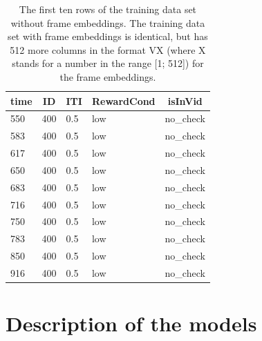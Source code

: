 \documentclass[
  man]{apa6}
\begin{document}
\begin{table}[tbp]

\begin{center}
\begin{threeparttable}

\caption{\label{tab:datatable}The first ten rows of the training data set without frame embeddings. The training data set with frame embeddings is identical, but has 512 more columns in the format VX (where X stands for a number in the range [1; 512]) for the frame embeddings.}

\begin{tabular}{lllll}
\toprule
time & \multicolumn{1}{c}{ID} & \multicolumn{1}{c}{ITI} & \multicolumn{1}{c}{RewardCond} & \multicolumn{1}{c}{isInVid}\\
\midrule
550 & 400 & 0.5 & low & no\_check\\
583 & 400 & 0.5 & low & no\_check\\
617 & 400 & 0.5 & low & no\_check\\
650 & 400 & 0.5 & low & no\_check\\
683 & 400 & 0.5 & low & no\_check\\
716 & 400 & 0.5 & low & no\_check\\
750 & 400 & 0.5 & low & no\_check\\
783 & 400 & 0.5 & low & no\_check\\
850 & 400 & 0.5 & low & no\_check\\
916 & 400 & 0.5 & low & no\_check\\
\bottomrule
\end{tabular}

\end{threeparttable}
\end{center}

\end{table}

\hypertarget{description-of-the-models}{%
\section{Description of the models}\label{description-of-the-models}}
\end{document}
